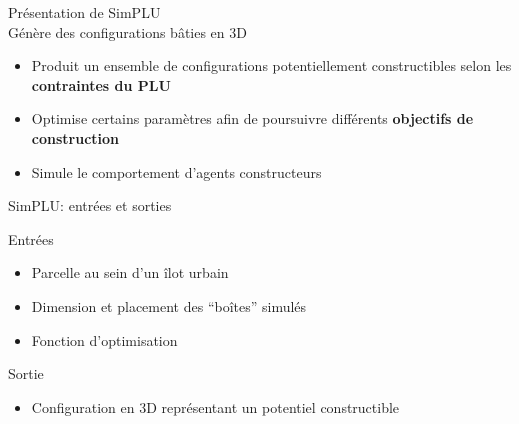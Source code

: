 \documentclass[xcolor=table]{beamer}
\begin{document}
\begin{frame}{Présentation de SimPLU}
	\\
	Génère des configurations bâties en 3D
	\begin{itemize}
		\item Produit un ensemble de configurations potentiellement constructibles selon les \textbf{contraintes du PLU}
		\item Optimise certains paramètres afin de poursuivre différents \textbf{objectifs de construction}
		\item Simule le comportement d'agents constructeurs
	\end{itemize} 
\end{frame}

\begin{frame}{SimPLU: entrées et sorties}
	\begin{block}{Entrées}
		\begin{itemize}
			\item Parcelle au sein d'un îlot urbain
			\item Dimension et placement des ``boîtes'' simulés
			\item Fonction d'optimisation
		\end{itemize}
	\end{block}
	\begin{block}{Sortie}
		\begin{itemize}
			\item Configuration en 3D représentant un potentiel constructible
		\end{itemize}
	\end{block}
	\begin{block}
	\end{block}		
\end{frame}
\end{document}
